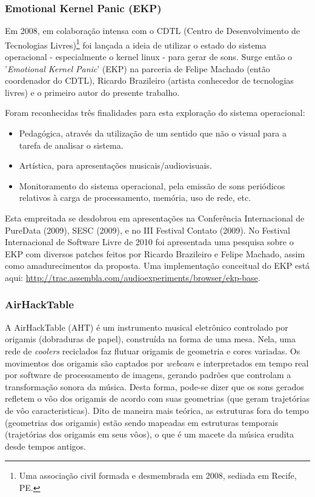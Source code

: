 \subsubsection{Emotional Kernel Panic (EKP)}

Em 2008, em colaboração intensa com o CDTL (Centro de
Desenvolvimento de Tecnologias Livres)\footnote{Uma associação
  civil formada e desmembrada em 2008, sediada em Recife, PE.} foi
lançada a ideia de utilizar o estado do sistema operacional -
especialmente o kernel linux - para gerar de sons. Surge então o 
'\emph{Emotional Kernel Panic}' (EKP) na parceria de Felipe
Machado (então coordenador do CDTL),
Ricardo Brazileiro (artista conhecedor de tecnologias livres)
e o primeiro autor do presente trabalho.

Foram reconhecidas três finalidades para esta exploração
do sistema operacional:

\begin{itemize}
\item Pedagógica, através da utilização de um sentido que não o visual para a tarefa de analisar o sistema.
\item Artística, para apresentações musicais/audiovisuais.
\item Monitoramento do sistema operacional, pela emissão de sons periódicos relativos à carga de processamento, memória, uso de rede, etc.
\end{itemize}

Esta empreitada se desdobrou em apresentações na Conferência Internacional de PureData (2009), SESC (2009),
e no III Festival Contato (2009). No Festival Internacional de Software Livre de 2010 foi apresentada
uma pesquisa sobre o EKP com diversos patches feitos por Ricardo Brazileiro e Felipe Machado, assim
como amadurecimentos da proposta.
Uma implementação conceitual do EKP está aqui: \url{http://trac.assembla.com/audioexperiments/browser/ekp-base}.



\subsubsection{AirHackTable}

A AirHackTable (AHT) é um instrumento musical eletrônico controlado por
origamis (dobraduras de papel), construída na forma de uma mesa. Nela,
uma rede de \emph{coolers} reciclados faz flutuar origamis de geometria e
cores variadas. Os movimentos dos origamis são captados por \emph{webcam} e
interpretados em tempo real por software de processamento de imagens,
gerando padrões que controlam a transformação sonora da música. Desta
forma, pode-se dizer que os sons gerados refletem o vôo dos origamis
de acordo com suas geometrias (que geram trajetórias de vôo
caracteristicas). Dito de maneira mais teórica, as estruturas fora
do tempo (geometrias dos origamis) estão sendo mapeadas em estruturas
temporais (trajetórias dos origamis em seus vôos), o que é um macete
da música erudita desde tempos antigos.

